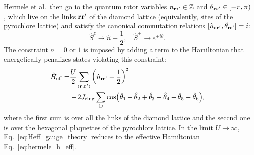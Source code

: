 \documentclass[twocolumn,superscriptaddress,amsmath,amssymb,aps,prx,nofootinbib]{revtex4-2}
\begin{document}
Hermele et al.~then go to the quantum rotor variables $n_{\vb{r}\vb{r}'} \in \mathbb{Z}$ and $\theta_{\vb{r}\vb{r}'} \in [-\pi,\pi)$, which live on the links $\vb{r}\vb{r}'$ of the diamond lattice (equivalently, sites of the pyrochlore lattice) and satisfy the canonical commutation relations $[\hat{n}_{\vb{r}\vb{r}'} ,\hat{\theta}_{\vb{r}\vb{r}'} ] = i$:
\begin{equation} \label{eq:rotor_mapping}
  \hat{S}^z \rightarrow \hat{n} - \frac{1}{2},  \quad  \hat{S}^\pm  \rightarrow e^{ \pm i\hat{\theta}}.
\end{equation}
The constraint $n = 0 \text{ or }1$ is imposed by adding a term to the Hamiltonian that energetically penalizes states violating this constraint: 
\begin{align} \label{eq:Heff_gauge_theory}
  \hat{H}_{\text{eff}} = &  \frac{U}{2} \sum_{\mathbf{\langle \vb{r},\vb{r}' \rangle }} \left( \hat{n}_{\vb{r}\vb{r}'} -\frac{1}{2} \right)^2 \\ \nonumber
&  - 2 J_{\text{ring}} \sum_{\hexagon} \cos(\hat{\theta}_1 -\hat{\theta}_2+\hat{\theta}_3-\hat{\theta}_4+\hat{\theta}_5-\hat{\theta}_6),
\end{align}
where the first sum is over all the links of the diamond lattice and the second one is over the hexagonal plaquettes of the pyrochlore lattice. 
In the limit $U \rightarrow \infty$, Eq.~\eqref{eq:Heff_gauge_theory} reduces to the effective Hamiltonian Eq.~\eqref{eq:hermele_h_eff}.
\end{document}
